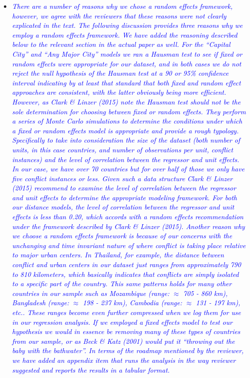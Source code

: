\begin{enumerate}
\begin{itemize}
\item \textcolor{blue}{\emph{
	There are a number of reasons why we chose a random effects framework, however, we agree with the reviewers that these reasons were not clearly explicated in the text. The following discussion provides three reasons why we employ a random effects framework. We have added the reasoning described below to the relevant section in the actual paper as well.
	For the ``Capital City'' and ``Any Major City'' models we ran a Hausman test to see if fixed or random effects were appropriate for our dataset, and in both cases we do not reject the null hypothesis of the Hausman test at a 90 or 95\% confidence interval indicating by at least that standard that both fixed and random effect approaches are consistent, with the latter obviously being more efficient.
	However, as Clark \& Linzer (2015) note the Hausman test should not be the sole determination for choosing between fixed or random effects. They perform a series of Monte Carlo simulations to determine the conditions under which a fixed or random effects model is appropriate and provide a rough typology. Specifically to take into consideration the size of the dataset (both number of units, in this case countries, and number of observations per unit, conflict instances) and the level of correlation between the regressor and unit effects. In our case, we have over 70 countries but for over half of those we only have five conflict instances or less. Given such a data structure Clark \& Linzer (2015) recommend to examine the level of correlation between the regressor and unit effects to determine the appropriate modeling framework. For both our distance models, the level of correlation between the regressor and unit effects is less than 0.20, which accords with a random effects recommendation under the framework described by Clark \& Linzer (2015). 
	Another reason why we choose a random effects framework is because of our concerns with the unchanging and time invariant nature of where conflict is taking place relative to major urban centers. In Thailand, for example, the distance between conflict and urban centers in our dataset just ranges from approximately 790 to 810 kilometers, which basically indicates that conflicts are simply isolated to a specific part of the country. This same patterns holds for many other countries in our sample such as Mozambique (range: $\approx$ 705 - 860 km), Bangladesh (range: $\approx$ 198 - 237 km), Cambodia (range: $\approx$ 131 - 197 km), etc.. These ranges become even further compressed when we log them for use in our regression analysis. If we employed a fixed effects model to test our hypothesis we would in essence be removing many of these types of countries from our sample, or as Beck \& Katz (2001) would put it ``throwing out the baby with the bathwater''. 
	In terms of the roadmap mentioned by the reviewer, we have added an appendix item that runs the analysis in the way reviewer suggested and reports the results in a tabular format. 
}}
\end{itemize}


\end{enumerate}
